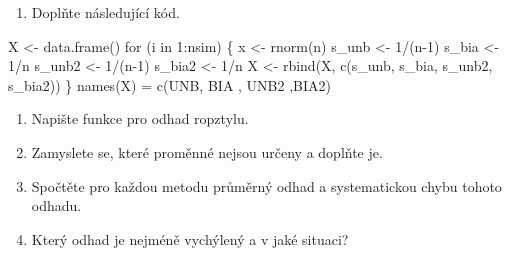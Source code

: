\documentclass[
  letterpaper,
  DIV=11,
  numbers=noendperiod]{scrreprt}
\newenvironment{Shaded}{\begin{snugshade}}{\end{snugshade}}
\newcommand{\ControlFlowTok}[1]{\textcolor[rgb]{0.00,0.23,0.31}{#1}}
\newcommand{\DecValTok}[1]{\textcolor[rgb]{0.68,0.00,0.00}{#1}}
\newcommand{\FunctionTok}[1]{\textcolor[rgb]{0.28,0.35,0.67}{#1}}
\newcommand{\NormalTok}[1]{\textcolor[rgb]{0.00,0.23,0.31}{#1}}
\newcommand{\OtherTok}[1]{\textcolor[rgb]{0.00,0.23,0.31}{#1}}
\newcommand{\SpecialCharTok}[1]{\textcolor[rgb]{0.37,0.37,0.37}{#1}}
\newcommand{\StringTok}[1]{\textcolor[rgb]{0.13,0.47,0.30}{#1}}
\providecommand{\tightlist}{%
  \setlength{\itemsep}{0pt}\setlength{\parskip}{0pt}}\usepackage{longtable,booktabs,array}
\begin{document}
\begin{tcolorbox}[enhanced jigsaw, toprule=.15mm, breakable, title=\textcolor{quarto-callout-tip-color}{\faLightbulb}\hspace{0.5em}{Cvičení}, colframe=quarto-callout-tip-color-frame, bottomrule=.15mm, left=2mm, leftrule=.75mm, colbacktitle=quarto-callout-tip-color!10!white, colback=white, bottomtitle=1mm, toptitle=1mm, opacityback=0, opacitybacktitle=0.6, arc=.35mm, coltitle=black, rightrule=.15mm, titlerule=0mm]

\begin{enumerate}
\def\labelenumi{\arabic{enumi}.}
\tightlist
\item
  Doplňte následující kód.\\
\end{enumerate}

\begin{Shaded}
\begin{Highlighting}[]
\NormalTok{X }\OtherTok{\textless{}{-}} \FunctionTok{data.frame}\NormalTok{()}
\ControlFlowTok{for}\NormalTok{ (i }\ControlFlowTok{in} \DecValTok{1}\SpecialCharTok{:}\NormalTok{nsim) \{}
\NormalTok{  x }\OtherTok{\textless{}{-}} \FunctionTok{rnorm}\NormalTok{(n)}
\NormalTok{  s\_unb }\OtherTok{\textless{}{-}} \DecValTok{1}\SpecialCharTok{/}\NormalTok{(n}\DecValTok{{-}1}\NormalTok{)}
\NormalTok{  s\_bia }\OtherTok{\textless{}{-}} \DecValTok{1}\SpecialCharTok{/}\NormalTok{n}
\NormalTok{  s\_unb2 }\OtherTok{\textless{}{-}} \DecValTok{1}\SpecialCharTok{/}\NormalTok{(n}\DecValTok{{-}1}\NormalTok{)}
\NormalTok{  s\_bia2 }\OtherTok{\textless{}{-}} \DecValTok{1}\SpecialCharTok{/}\NormalTok{n}
\NormalTok{  X }\OtherTok{\textless{}{-}} \FunctionTok{rbind}\NormalTok{(X, }\FunctionTok{c}\NormalTok{(s\_unb, s\_bia, s\_unb2, s\_bia2))}
\NormalTok{\}}
\FunctionTok{names}\NormalTok{(X) }\OtherTok{=} \FunctionTok{c}\NormalTok{(}\StringTok{\textquotesingle{}UNB\textquotesingle{}}\NormalTok{, }\StringTok{\textquotesingle{}BIA\textquotesingle{}}\NormalTok{ , }\StringTok{\textquotesingle{}UNB2\textquotesingle{}}\NormalTok{ ,}\StringTok{\textquotesingle{}BIA2\textquotesingle{}}\NormalTok{)}
\end{Highlighting}
\end{Shaded}

\begin{enumerate}
\def\labelenumi{\alph{enumi})}
\tightlist
\item
  Napište funkce pro odhad ropztylu.\\
\item
  Zamyslete se, které proměnné nejsou určeny a doplňte je.\\
\item
  Spočtěte pro každou metodu průměrný odhad a systematickou chybu tohoto
  odhadu.\\
\item
  Který odhad je nejméně vychýlený a v jaké situaci?\\
\end{enumerate}

\end{tcolorbox}
\end{document}
